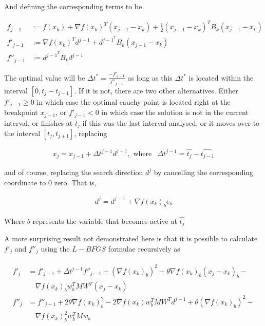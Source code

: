 And defining the corresponding terms to be

\begin{align} \label{cauchydefinitions}
  f_{j-1} & := f(x_k) + \nabla f(x_k)^T ( x_{j-1} - x_k) + \frac{1}{2} ( x_{j-1} - x_k)^T B_k ( x_{j-1} - x_k) \\
  f'_{j-1} & := \nabla f(x_k)^T d^{j-1} + d^{{j-1}^T} B_k (x_{j-1} - x_k) \\
  f''_{j-1} & := d^{{j-1}^T} B_k d^{j-1}
\end{align}

The optimal value will be $\Delta t^* = \frac{-f'_{j-1}}{f''_{j-1}}$ as long as this $\Delta t^*$ is located within the interval $[0, t_j - t_{j-1}]$.  If it is not, there are two other alternatives.  Either $f'_{j-1} \geq 0$ in which case the optimal cauchy point is located right at the breakpoint $x_{j-1}$, or $f'_{j-1} < 0$ in which case the solution is not in the current interval, or finishes at $t_j$ if this was the last interval analysed, or it moves over to the interval $[t_j, t_{j+1}]$, replacing

\begin{align}
  x_j = x_{j-1} + \Delta t^{j-1} d^{j-1}, \text{ where} & 
  \Delta t^{j-1} = \hat{t_j} - \hat{t_{j-1}}
\end{align}

and of course, replacing the search direction $d^j$ by cancelling the corresponding coordinate to $0$ zero.  That is, 

\begin{equation}
  \begin{aligned}
    d^j = d^{j-1} + \nabla f(x_k)_b e_b
  \end{aligned}
\end{equation}

Where $b$ represents the variable that becomes active at $\hat{t_j}$

A more surprising result \citep{mainpaper} not demonstrated here is that it is possible to calculate $f'_j$ and $f''_j$ using the $L-BFGS$ formulae recursively as 

\begin{align} \label{cauchydeflbfgs}
  \begin{split}
  f'_j & = f'_{j-1} + \Delta t^{j-1} f''_{j-1} + (\nabla f(x_k)_b)^2 + \theta \nabla f(x_k)_b (x_j - x_k)_b - \\
  & \quad \nabla f(x_k)_b w_b^T MW^T (x_j - x_k) \\
  f''_j & = f''_{j-1} + 2 \theta \nabla f(x_k)_b^2 - 2 \nabla f(x_k) w_b^T M W^T d^{j-1} + \theta (\nabla f(x_k)_b)^2 - \\
  & \quad \nabla f(x_k)_b^2 w_b^T M w_b
  \end{split}
\end{align}

